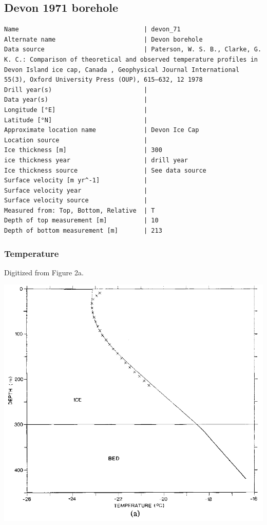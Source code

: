 \documentclass[article,a4paper,times,11pt,twoside]{article}
\begin{document}
\subsection{Devon 1971 borehole}
\label{sec:orgf55c493}
\begin{verbatim}
Name                                  | devon_71
Alternate name                        | Devon borehole
Data source                           | Paterson, W. S. B., Clarke, G. K. C.: Comparison of theoretical and observed temperature profiles in Devon Island ice cap, Canada , Geophysical Journal International 55(3), Oxford University Press (OUP), 615–632, 12 1978 
Drill year(s)                         | 
Data year(s)                          | 
Longitude [°E]                        | 
Latitude [°N]                         | 
Approximate location name             | Devon Ice Cap
Location source                       | 
Ice thickness [m]                     | 300
ice thickness year                    | drill year
Ice thickness source                  | See data source
Surface velocity [m yr^-1]            | 
Surface velocity year                 | 
Surface velocity source               | 
Measured from: Top, Bottom, Relative  | T
Depth of top measurement [m]          | 10
Depth of bottom measurement [m]       | 213
\end{verbatim}

\subsubsection{Temperature}
\label{sec:org28bf279}

Digitized from \textcite{paterson_1978} Figure 2a.

\begin{center}
\includegraphics[width=.9\linewidth]{devon_71/paterson_1978_fig2a.png}
\end{center}
\end{document}
